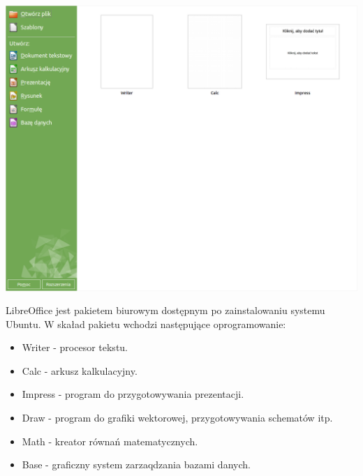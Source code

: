 \begin{center}
	\includegraphics[width=\linewidth]{images/programy_libreoffice1.png}
\end{center}

LibreOffice jest pakietem biurowym dostępnym po zainstalowaniu systemu Ubuntu. W skaład pakietu wchodzi następujące oprogramowanie:
\begin{itemize}
\item \textcolor{ubuntu_orange}{Writer} - procesor tekstu.
\item \textcolor{ubuntu_orange}{Calc} - arkusz kalkulacyjny.
\item \textcolor{ubuntu_orange}{Impress} - program do przygotowywania prezentacji.
\item \textcolor{ubuntu_orange}{Draw} - program do grafiki wektorowej, przygotowywania schematów itp.
\item \textcolor{ubuntu_orange}{Math} - kreator równań matematycznych.
\item \textcolor{ubuntu_orange}{Base} - graficzny system zarzaqdzania bazami danych.
\end{itemize}